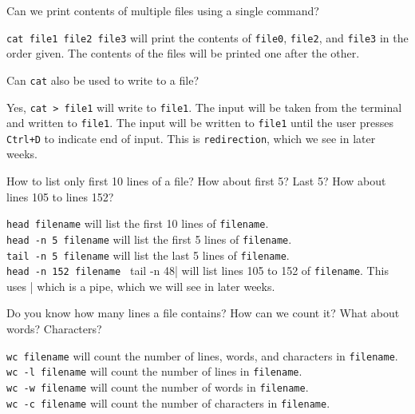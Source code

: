 
\begin{qs}
  Can we print contents of multiple files using a single command?
\end{qs}

\begin{ans}
  \lstinline|cat file1 file2 file3| will print the contents of \lstinline|file0|, \lstinline|file2|, and \lstinline|file3|
  in the order given. The contents of the files will be printed one after the other.
\end{ans}

\begin{qs}
  Can \lstinline|cat| also be used to write to a file?
\end{qs}

\begin{ans}
  Yes, \lstinline|cat > file1| will write to \lstinline|file1|. The input will be taken from the
  terminal and written to \lstinline|file1|. The input will be written to \lstinline|file1| until
  the user presses \lstinline|Ctrl+D| to indicate end of input.
  This is \lstinline|redirection|, which we see in later weeks.
\end{ans}

\begin{qs}
  How to list only first 10 lines of a file? How about first 5? Last 5?
  How about lines 105 to lines 152?
\end{qs}

\begin{ans}
  \lstinline|head filename| will list the first 10 lines of \lstinline|filename|. \\
  \lstinline|head -n 5 filename| will list the first 5 lines of \lstinline|filename|. \\
  \lstinline|tail -n 5 filename| will list the last 5 lines of \lstinline|filename|. \\
  \lstinline|head -n 152 filename | tail -n 48| will list lines 105 to 152 of \lstinline|filename|.
  This uses \lstinline||| which is a pipe, which we will see in later weeks.
\end{ans}

\begin{qs}
  Do you know how many lines a file contains? How can we count it?
  What about words? Characters?
\end{qs}

\begin{ans}
  \lstinline|wc filename| will count the number of lines, words, and characters in \lstinline|filename|. \\
  \lstinline|wc -l filename| will count the number of lines in \lstinline|filename|. \\
  \lstinline|wc -w filename| will count the number of words in \lstinline|filename|. \\
  \lstinline|wc -c filename| will count the number of characters in \lstinline|filename|.
\end{ans}

